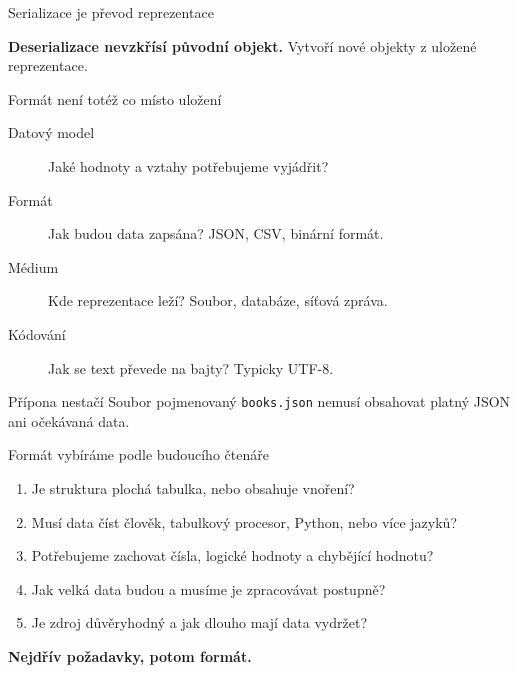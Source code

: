 \documentclass[aspectratio=169]{beamer}
\newcommand{\term}[1]{\textcolor{CodeBlue}{\textbf{#1}}}
\begin{document}
\begin{frame}{Serializace je převod reprezentace}
  \centering
  \vspace{7mm}

  \term{Deserializace nevzkřísí původní objekt.} Vytvoří nové objekty z uložené reprezentace.
\end{frame}

\begin{frame}{Formát není totéž co místo uložení}
  \begin{description}
    \item[Datový model] Jaké hodnoty a vztahy potřebujeme vyjádřit?
    \item[Formát] Jak budou data zapsána? JSON, CSV, binární formát.
    \item[Médium] Kde reprezentace leží? Soubor, databáze, síťová zpráva.
    \item[Kódování] Jak se text převede na bajty? Typicky UTF-8.
  \end{description}
  \begin{alertblock}{Přípona nestačí}
    Soubor pojmenovaný \texttt{books.json} nemusí obsahovat platný JSON ani očekávaná data.
  \end{alertblock}
\end{frame}

\begin{frame}{Formát vybíráme podle budoucího čtenáře}
  \begin{enumerate}
    \item Je struktura plochá tabulka, nebo obsahuje vnoření?
    \item Musí data číst člověk, tabulkový procesor, Python, nebo více jazyků?
    \item Potřebujeme zachovat čísla, logické hodnoty a chybějící hodnotu?
    \item Jak velká data budou a musíme je zpracovávat postupně?
    \item Je zdroj důvěryhodný a jak dlouho mají data vydržet?
  \end{enumerate}
  \vspace{2mm}
  \term{Nejdřív požadavky, potom formát.}
\end{frame}
\end{document}
